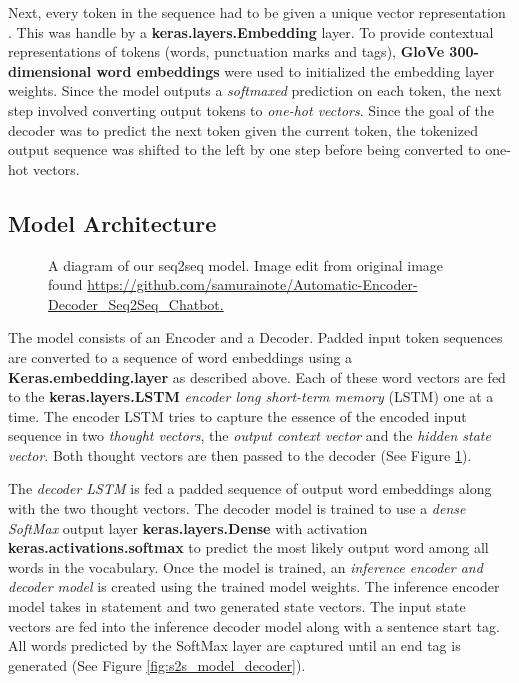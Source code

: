 Next, every token in the sequence had to be given a unique vector representation \cite{DBLP:journals/corr/MikolovSCCD13}. 
This was handle by a \textbf{keras.layers.Embedding} layer. 
To provide contextual representations of tokens (words, punctuation marks and tags), \textbf{GloVe 300-dimensional word embeddings} were used to initialized the embedding layer weights. 
Since the model outputs a \emph{softmaxed} prediction on each token, the next step involved converting output tokens to \emph{one-hot vectors}. 
Since the goal of the decoder was to predict the next token given the current token, the tokenized output sequence was shifted to the left by one step before being converted to one-hot vectors.  
%

\subsection{Model Architecture}
\begin{figure}
	\begin{center}
	\end{center}
	\caption{A diagram of our seq2seq model. Image edit from original image found \url{https://github.com/samurainote/Automatic-Encoder-Decoder_Seq2Seq_Chatbot.}}
	\label{fig:s2s_model}
\end{figure}
The model consists of an Encoder and a Decoder.
Padded input token sequences are converted to a sequence of word embeddings using a \textbf{Keras.embedding.layer} as described above.
Each of these word vectors are fed to the \textbf{keras.layers.LSTM} \emph{encoder long short-term memory} (LSTM) one at a time. 
The encoder LSTM tries to capture the essence of the encoded input sequence in two \emph{thought vectors}, the \emph{output context vector} and the \emph{hidden state vector}.
Both thought vectors are then passed to the decoder (See Figure \ref{fig:s2s_model}).

The \emph{decoder LSTM} is fed a padded sequence of output word embeddings along with the two thought vectors.
The decoder model is trained to use a \emph{dense SoftMax} output layer \textbf{keras.layers.Dense} with activation \textbf{keras.activations.softmax} to predict the most likely output word among all words in the vocabulary.
Once the model is trained, an \emph{inference encoder and decoder model} is created using the trained model weights. 
The inference encoder model takes in statement and two generated state vectors. 
The input state vectors are fed into the inference decoder model along with a sentence start tag. 
All words predicted by the SoftMax layer are captured until an end tag is generated (See Figure \ref{fig:s2s_model_decoder}).

